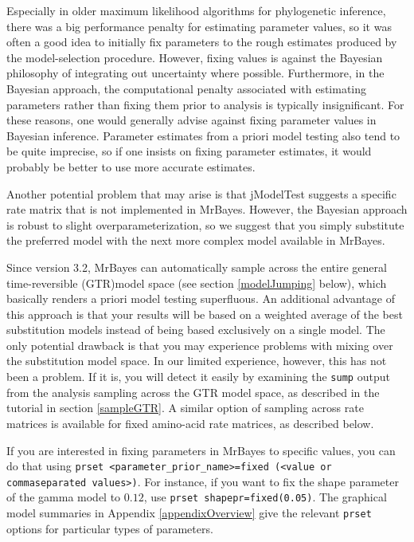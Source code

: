 \documentclass[12pt]{book}
\newcommand{\ttt}[1]{\texttt{#1}}
\begin{document}
Especially in older maximum likelihood algorithms for phylogenetic inference, there was a big
performance penalty for estimating parameter values, so it was often a good idea to initially fix
parameters to the rough estimates produced by the model-selection procedure. However, fixing values
is against the Bayesian philosophy of integrating out uncertainty where possible. Furthermore, in
the Bayesian approach, the computational penalty associated with estimating parameters rather than
fixing them prior to analysis is typically insignificant. For these reasons, one would generally
advise against fixing parameter values in Bayesian inference. Parameter estimates from a priori
model testing also tend to be quite imprecise, so if one insists on fixing parameter estimates, it
would probably be better to use more accurate estimates.

Another potential problem that may arise is that jModelTest suggests a specific rate matrix that is
not implemented in MrBayes. However, the Bayesian approach is robust to slight
overparameterization, so we suggest that you simply substitute the preferred model with the next
more complex model available in MrBayes.

Since version 3.2, MrBayes can automatically sample across the entire general time-reversible
(GTR)model space (see section \ref{modelJumping} below), which basically renders a priori model
testing superfluous. An additional advantage of this approach is that your results will be based on
a weighted average of the best substitution models instead of being based exclusively on a single
model. The only potential drawback is that you may experience problems with mixing over the
substitution model space. In our limited experience, however, this has not been a problem. If it
is, you will detect it easily by examining the \ttt{sump} output from the analysis sampling across
the GTR model space, as described in the tutorial in section \ref{sampleGTR}. A similar option of
sampling across rate matrices is available for fixed amino-acid rate matrices, as described below.

If you are interested in fixing parameters in MrBayes to specific values, you can do that using
\ttt{prset <parameter\_prior\_name>=fixed (<value or commaseparated values>)}. For instance, if
you want to fix the shape parameter of the gamma model to $0.12$, use \ttt{prset
shapepr=fixed(0.05)}. The graphical model summaries in Appendix \ref{appendixOverview} give the
relevant \ttt{prset} options for particular types of parameters.
\end{document}
